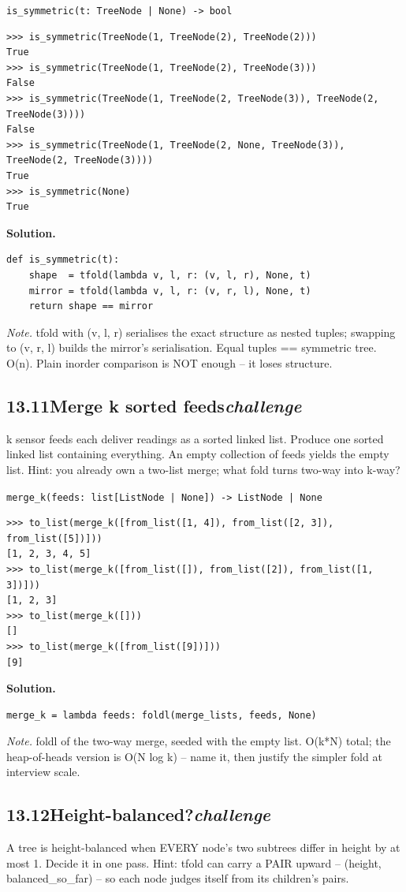 \documentclass[10pt,letterpaper]{book}
\begin{document}
\noindent\texttt{is\_symmetric(t: TreeNode | None) -> bool}
\begin{lstlisting}[style=ex]
>>> is_symmetric(TreeNode(1, TreeNode(2), TreeNode(2)))
True
>>> is_symmetric(TreeNode(1, TreeNode(2), TreeNode(3)))
False
>>> is_symmetric(TreeNode(1, TreeNode(2, TreeNode(3)), TreeNode(2, TreeNode(3))))
False
>>> is_symmetric(TreeNode(1, TreeNode(2, None, TreeNode(3)), TreeNode(2, TreeNode(3))))
True
>>> is_symmetric(None)
True
\end{lstlisting}
\noindent\textbf{Solution.}
\begin{lstlisting}[style=code]
def is_symmetric(t):
    shape  = tfold(lambda v, l, r: (v, l, r), None, t)
    mirror = tfold(lambda v, l, r: (v, r, l), None, t)
    return shape == mirror
\end{lstlisting}
\noindent\textit{Note.} tfold with (v, l, r) serialises the exact structure as nested tuples; swapping to (v, r, l) builds the mirror's serialisation. Equal tuples == symmetric tree. O(n). Plain inorder comparison is NOT enough -- it loses structure.

\subsection*{13.11\quad Merge k sorted feeds\hfill\textnormal{\textit{challenge}}}
k sensor feeds each deliver readings as a sorted linked list. Produce one sorted linked list containing everything. An empty collection of feeds yields the empty list. Hint: you already own a two-list merge; what fold turns two-way into k-way?

\noindent\texttt{merge\_k(feeds: list[ListNode | None]) -> ListNode | None}
\begin{lstlisting}[style=ex]
>>> to_list(merge_k([from_list([1, 4]), from_list([2, 3]), from_list([5])]))
[1, 2, 3, 4, 5]
>>> to_list(merge_k([from_list([]), from_list([2]), from_list([1, 3])]))
[1, 2, 3]
>>> to_list(merge_k([]))
[]
>>> to_list(merge_k([from_list([9])]))
[9]
\end{lstlisting}
\noindent\textbf{Solution.}
\begin{lstlisting}[style=code]
merge_k = lambda feeds: foldl(merge_lists, feeds, None)
\end{lstlisting}
\noindent\textit{Note.} foldl of the two-way merge, seeded with the empty list. O(k*N) total; the heap-of-heads version is O(N log k) -- name it, then justify the simpler fold at interview scale.

\subsection*{13.12\quad Height-balanced?\hfill\textnormal{\textit{challenge}}}
A tree is height-balanced when EVERY node's two subtrees differ in height by at most 1. Decide it in one pass. Hint: tfold can carry a PAIR upward -- (height, balanced\_so\_far) -- so each node judges itself from its children's pairs.
\end{document}
